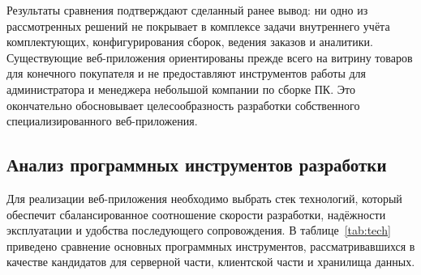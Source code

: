 Результаты сравнения подтверждают сделанный ранее вывод: ни одно из рассмотренных решений не покрывает в комплексе задачи внутреннего учёта комплектующих, конфигурирования сборок, ведения заказов и аналитики. Существующие веб-приложения ориентированы прежде всего на витрину товаров для конечного покупателя и не предоставляют инструментов работы для администратора и менеджера небольшой компании по сборке ПК. Это окончательно обосновывает целесообразность разработки собственного специализированного веб-приложения.

\subsection{Анализ программных инструментов разработки}

Для реализации веб-приложения необходимо выбрать стек технологий, который обеспечит сбалансированное соотношение скорости разработки, надёжности эксплуатации и удобства последующего сопровождения. В таблице~\ref{tab:tech} приведено сравнение основных программных инструментов, рассматривавшихся в качестве кандидатов для серверной части, клиентской части и хранилища данных.

